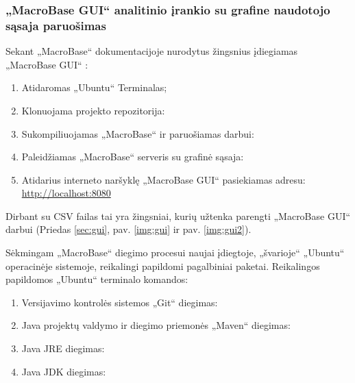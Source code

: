 \documentclass{VUMIFPSkursinis}
\begin{document}
\subsubsection{„MacroBase GUI“ analitinio įrankio su grafine naudotojo sąsaja paruošimas} \label{subsubsec:macrogui}
Sekant „MacroBase“ dokumentacijoje nurodytus žingsnius įdiegiamas „MacroBase GUI“ \cite{macrobase_doc}:
\begin{enumerate}
\item Atidaromas „Ubuntu“ Terminalas;
\item Klonuojama projekto repozitorija:\\
\item Sukompiliuojamas „MacroBase“ ir paruošiamas darbui:\\
\item Paleidžiamas „MacroBase“ serveris su grafinė sąsaja:\\
\item Atidarius interneto naršyklę „MacroBase GUI“ pasiekiamas adresu: \\\url{http://localhost:8080}
\end{enumerate}

Dirbant su CSV failas tai yra žingsniai, kurių užtenka parengti „MacroBase GUI“ darbui (Priedas \ref{sec:gui}, pav. \ref{img:gui} ir pav. \ref{img:gui2}).

Sėkmingam „MacroBase“ diegimo procesui naujai įdiegtoje, „švarioje“ „Ubuntu“ operacinėje sistemoje, reikalingi papildomi pagalbiniai paketai. Reikalingos papildomos „Ubuntu“ terminalo komandos:
\begin{enumerate}
\item Versijavimo kontrolės sistemos „Git“ \cite{git} diegimas:\\
\item Java projektų valdymo ir diegimo priemonės „Maven“ \cite{maven} diegimas:\\
\item Java JRE \cite{jre_jdk} diegimas:\\
\item Java JDK \cite{jre_jdk} diegimas:\\
\end{enumerate}
\end{document}
